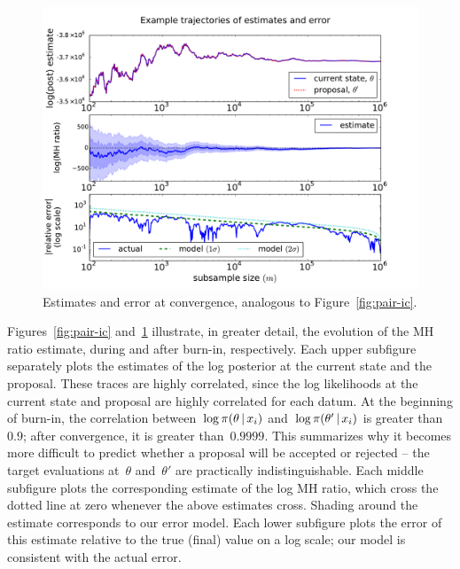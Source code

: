 \documentclass[angelino.tex]{subfiles}
\begin{document}
\begin{figure}[t!]
\begin{center}
\includegraphics[width=\textwidth]{figs/mix-mle-traces-pair.pdf}
\end{center}
\caption{Estimates and error at convergence, analogous to Figure~\ref{fig:pair-ic}.}
\label{fig:pair-mle}
\end{figure}

Figures~\ref{fig:pair-ic} and~\ref{fig:pair-mle} illustrate, in greater detail,
the evolution of the MH ratio estimate, during and after burn-in, respectively.
%
Each upper subfigure separately plots the estimates of the log posterior at the
current state and the proposal.
These traces are highly correlated, since the log likelihoods at the current
state and proposal are highly correlated for each datum.
At the beginning of burn-in, the correlation between~$\log \pi(\theta \,|\, x_i)$
and~$\log \pi(\theta' \,|\, x_i)$ is greater than~${0.9}$;
after convergence, it is greater than~${0.9999}$.
This summarizes why it becomes more difficult to predict whether a proposal will
be accepted or rejected -- the target evaluations at~$\theta$ and~$\theta'$ are
practically indistinguishable.
%
Each middle subfigure plots the corresponding estimate of the log MH ratio,
which cross the dotted line at zero whenever the above estimates cross.
Shading around the estimate corresponds to our error model.
%
Each lower subfigure plots the error of this estimate relative to the true (final)
value on a log scale; our model is consistent with the actual error.
\end{document}
